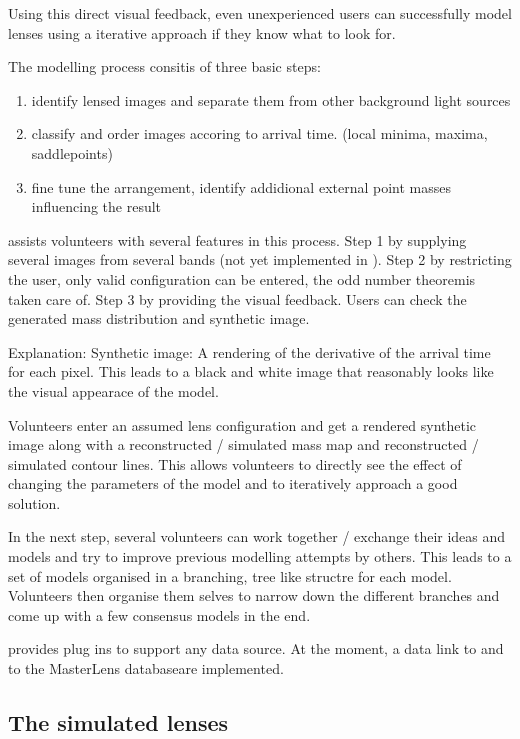 Using this direct visual feedback, even unexperienced users can successfully model lenses using a iterative approach if they know what to look for.

The modelling process consitis of three basic steps:

\begin{enumerate}
  \item identify lensed images and separate them from other background light sources
  \item classify and order images accoring to arrival time. (local minima, maxima, saddlepoints)
  \item fine tune the arrangement, identify addidional external point masses influencing the result
\end{enumerate}

\spl assists volunteers with several features in this process.
Step 1 by supplying several images from several bands (not yet implemented in \sw).
Step 2 by restricting the user, only valid configuration can be entered, the odd number theorem\needcite is taken care of.
Step 3 by providing the visual feedback. Users can check the generated mass distribution and synthetic image.

Explanation:
Synthetic image: A rendering of the derivative of the arrival time for each pixel. This leads to a black and white image that reasonably looks like the visual appearace of the model.

Volunteers enter an assumed lens configuration and get a rendered synthetic image along with a reconstructed / simulated mass map and reconstructed / simulated contour lines.
This allows volunteers to directly see the effect of changing the parameters of the model and to iteratively approach a good solution.

In the next step, several volunteers can work together / exchange their ideas and models and try to improve previous modelling attempts by others.
This leads to a set of models organised in a branching, tree like structre for each model.
Volunteers then organise them selves to narrow down the different branches and come up with a few consensus models in the end.

\spl provides plug ins to support any data source. At the moment, a data link to \sw and to the MasterLens database\needcite are implemented.






\subsection{The simulated lenses} \label{sec:sims}

